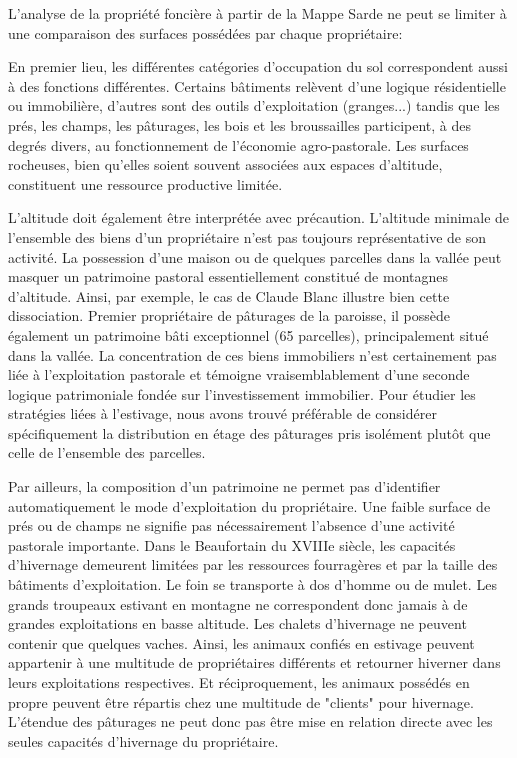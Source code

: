 \documentclass[12pt,a4paper]{report}
\begin{document}
	L'analyse de la propriété foncière à partir de la Mappe Sarde ne peut se limiter à une comparaison des surfaces possédées par chaque propriétaire:
	
	En premier lieu, les différentes catégories d'occupation du sol correspondent aussi à des fonctions différentes. Certains bâtiments relèvent d'une logique résidentielle ou immobilière, d'autres sont des outils d'exploitation (granges...) tandis que les prés, les champs, les pâturages, les bois et les broussailles participent, à des degrés divers, au fonctionnement de l'économie agro-pastorale. Les surfaces rocheuses, bien qu'elles soient souvent associées aux espaces d'altitude, constituent  une ressource productive limitée. 
	
	L'altitude doit également être interprétée avec précaution. L'altitude minimale de l'ensemble des biens d'un propriétaire n'est pas toujours représentative de son activité. La possession d'une maison ou de quelques parcelles dans la vallée peut masquer un patrimoine pastoral essentiellement constitué de montagnes d'altitude. 
	Ainsi, par exemple, le cas de Claude Blanc illustre bien cette dissociation. Premier propriétaire de pâturages de la paroisse, il possède également un patrimoine bâti exceptionnel (65 parcelles), principalement situé dans la vallée. La concentration de ces biens immobiliers n'est certainement pas liée à l'exploitation pastorale et témoigne vraisemblablement d'une seconde logique patrimoniale fondée sur l'investissement immobilier.
	Pour étudier les stratégies liées à l'estivage, nous avons trouvé préférable de considérer spécifiquement la distribution en étage des pâturages pris isolément plutôt que celle de l'ensemble des parcelles.
	
	Par ailleurs, la composition d'un patrimoine ne permet pas d'identifier automatiquement le mode d'exploitation du propriétaire. Une faible surface de prés ou de champs ne signifie pas nécessairement l'absence d'une activité pastorale importante. Dans le Beaufortain du XVIIIe siècle, les capacités d'hivernage demeurent limitées par les ressources fourragères et par la taille des bâtiments d'exploitation. Le foin se transporte à dos d'homme ou de mulet. Les grands troupeaux estivant en montagne ne correspondent donc jamais à de grandes exploitations en basse altitude. Les chalets d'hivernage ne peuvent contenir que quelques vaches. Ainsi, les animaux confiés en estivage peuvent appartenir à une multitude de propriétaires différents et retourner hiverner dans leurs exploitations respectives. Et réciproquement, les animaux possédés en propre peuvent être répartis chez une multitude de "clients" pour hivernage. L'étendue des pâturages ne peut donc pas être mise en relation directe avec les seules capacités d'hivernage du propriétaire.
	\\
	
\end{document}

